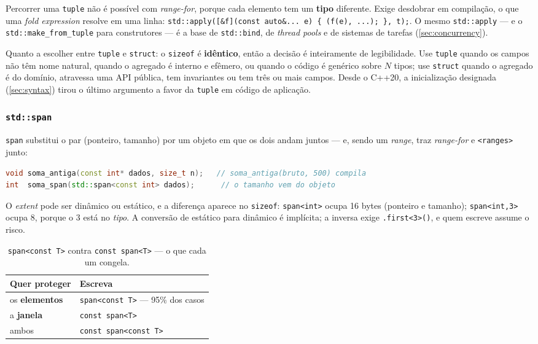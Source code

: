 Percorrer uma \texttt{tuple} não é possível com \emph{range-for}, porque cada
elemento tem um \textbf{tipo} diferente. Exige desdobrar em compilação, o que
uma \emph{fold expression} resolve em uma linha:
\texttt{std::apply([\&f](const auto\&... e) \{ (f(e), ...); \}, t);}. O mesmo
\texttt{std::apply} --- e o \texttt{std::make\_from\_tuple} para construtores
--- é a base de \texttt{std::bind}, de \emph{thread pools} e de sistemas de
tarefas (\cref{sec:concurrency}).

Quanto a escolher entre \texttt{tuple} e \texttt{struct}: o \texttt{sizeof} é
\textbf{idêntico}, então a decisão é inteiramente de legibilidade. Use
\texttt{tuple} quando os campos não têm nome natural, quando o agregado é
interno e efêmero, ou quando o código é genérico sobre $N$ tipos; use
\texttt{struct} quando o agregado é do domínio, atravessa uma API pública, tem
invariantes ou tem três ou mais campos. Desde o C++20, a inicialização designada
(\cref{sec:syntax}) tirou o último argumento a favor da \texttt{tuple} em código
de aplicação.

\subsubsection{\texttt{std::span}}

\texttt{span} substitui o par (ponteiro, tamanho) por um objeto em que os dois
andam juntos --- e, sendo um \emph{range}, traz \emph{range-for} e
\texttt{<ranges>} junto:

\begin{lstlisting}[style=bt, language=C++,
    caption={O parâmetro que não pode discordar de si mesmo.}]
void soma_antiga(const int* dados, size_t n);   // soma_antiga(bruto, 500) compila
int  soma_span(std::span<const int> dados);      // o tamanho vem do objeto
\end{lstlisting}

O \emph{extent} pode ser dinâmico ou estático, e a diferença aparece no
\texttt{sizeof}: \texttt{span<int>} ocupa 16 bytes (ponteiro e tamanho);
\texttt{span<int,3>} ocupa 8, porque o 3 está no \emph{tipo}. A conversão de
estático para dinâmico é implícita; a inversa exige \texttt{.first<3>()}, e
quem escreve assume o risco.

\begin{table}[htbp]
\centering
\caption{\texttt{span<const T>} contra \texttt{const span<T>} --- o que cada um congela.}
\label{tab:span-const}
\footnotesize
\begin{tabular}{@{}ll@{}}
\toprule
\textbf{Quer proteger} & \textbf{Escreva} \\
\midrule
os \textbf{elementos} & \texttt{span<const T>} --- 95\% dos casos \\
a \textbf{janela}     & \texttt{const span<T>} \\
ambos                 & \texttt{const span<const T>} \\
\bottomrule
\end{tabular}
\end{table}

